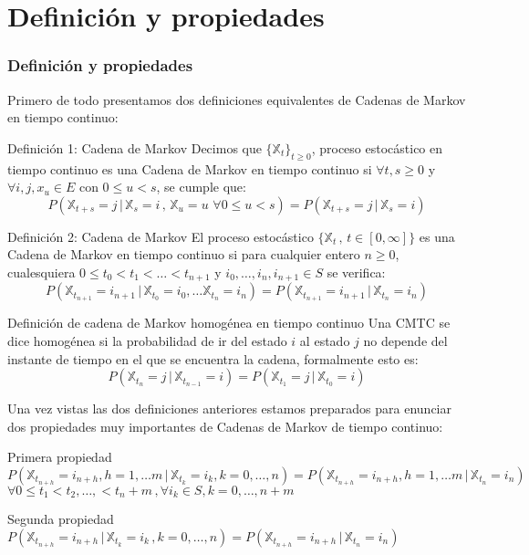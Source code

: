 \documentclass{beamer}
\begin{document}
\section{Definición y propiedades}
\begin{frame}
    \frametitle{Definición y propiedades}
    Primero de todo presentamos dos definiciones equivalentes de Cadenas de Markov en tiempo continuo:
    \newline
    \begin{block}{Definición 1: Cadena de Markov}
Decimos que $\{\mathbb{X}_t\}_{t\geq 0}$, proceso estocástico en tiempo continuo es una Cadena de Markov en tiempo continuo si $\forall t,s\geq 0$ y $\forall i,j,x_u\in E$ con $0\leq u <s$, se cumple que:
$$P(\mathbb{X}_{t+s}=j \, | \, \mathbb{X}_s =i \, , \,  \mathbb{X}_u =  u \,\, \forall 0\leq u< s)=P(\mathbb{X}_{t+s}=j \, | \, \mathbb{X}_s = i)$$
    \end{block}

\end{frame}
\begin{frame}
    \begin{block}{Definición 2: Cadena de Markov}
    El proceso estocástico $\{\mathbb{X}_t \, , \, t\in [0,\infty]\}$ es una Cadena de Markov en tiempo continuo si para cualquier entero $n\geq 0$, cualesquiera $0\leq t_0 < t_1 < \ldots < t_{n+1}$ y $i_0,\ldots , i_n,i_{n+1}\in S$ se verifica:
$$P(\mathbb{X}_{t_{n+1}}=i_{n+1}\, | \, \mathbb{X}_{t_0}=i_0 , \ldots \mathbb{X}_{t_n}=i_n)=P(\mathbb{X}_{t_{n+1}}=i_{n+1}\, | \, \mathbb{X}_{t_n}=i_n)$$
    \end{block}
\end{frame}
\begin{frame}
\begin{block}{Definición de cadena de Markov homogénea en tiempo continuo}
Una CMTC se dice homogénea si la probabilidad de ir del estado $i$ al estado $j$ no depende del instante de tiempo en el que se encuentra la cadena, formalmente esto es:
$$P(\mathbb{X}_{t_n}=j \, | \, \mathbb{X}_{t_{n-1}}=i)=P(\mathbb{X}_{t_1}=j \, | \, \mathbb{X}_{t_0}=i)$$
\end{block}
\end{frame}
\begin{frame}
Una vez vistas las dos definiciones anteriores estamos preparados para enunciar dos propiedades muy importantes de Cadenas de Markov de tiempo continuo:
\begin{block}{Primera propiedad}
$P(\mathbb{X}_{t_{n+h}}=i_{n+h}, h=1,\ldots m \, | \, \mathbb{X}_{t_k}=i_k, k=0,\ldots ,n)=P(\mathbb{X}_{t_{n+h}}=i_{n+h}, h=1,\ldots m\, |\, \mathbb{X}_{t_n}=i_n )$
\newline\newline
$\forall 0 \leq t_1< t_2, \ldots , < t_n+m\, , \forall i_k\in S, k=0,\ldots , n+m$
\end{block}
\begin{block}{Segunda propiedad}
$P(\mathbb{X}_{t_{n+h}}=i_{n+h}\, | \, \mathbb{X}_{t_k}=i_k \, ,  k=0,\ldots , n)=P(\mathbb{X}_{t_{n+h}}=i_{n+h}\, | \, \mathbb{X}_{t_n}=i_n)$
\end{block}
\end{frame}
\end{document}
